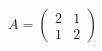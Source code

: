 \documentclass[preview]{standalone}
\begin{document}
\begin{align*}
A = \begin{pmatrix} 2 & 1 \\ 1 & 2 \end{pmatrix}
\end{align*}
\end{document}
